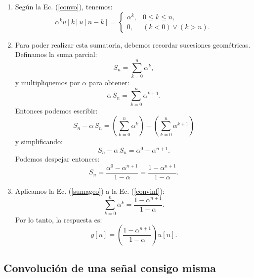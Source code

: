 \documentclass[11pt,a4paper,openany]{book}
\begin{document}
\begin{enumerate}
	\item Según la Ec. (\ref{convo}), tenemos:
	\begin{equation}
		\alpha^{k} u[k] u[n-k] = \begin{cases}
			\alpha^k, & 0 \leq k \leq n, \\ 
			0, & (k < 0) \lor (k > n).
		\end{cases}
		\label{convinf}
	\end{equation}
	
	\item Para poder realizar esta sumatoria, debemos recordar sucesiones geométricas. Definamos la suma parcial:
	\begin{equation}
		S_{n} = \sum_{k=0}^n \alpha^k,
	\end{equation}
	y multipliquemos por $\alpha$ para obtener:
	\begin{equation}
		\alpha \, S_{n} = \sum_{k=0}^n \alpha^{k+1}.
	\end{equation}
	Entonces podemos escribir:
	\begin{equation}
		S_{n} - \alpha \, S_{n} = \left( \sum_{k=0}^n \alpha^k \right) - \left( \sum_{k=0}^n \alpha^{k+1} \right)
	\end{equation}
	y simplificando:
	\begin{equation}
		S_n - \alpha \, S_n = \alpha^0 - \alpha^{n+1}.
	\end{equation}
	Podemos despejar entonces:
	\begin{equation}
		S_n = \frac{\alpha^0 - \alpha^{n+1}}{1-\alpha} = \frac{1-\alpha^{n+1}}{1-\alpha}.
		\label{sumageo}
	\end{equation}
	
	\item Aplicamos la Ec. (\ref{sumageo}) a la Ec. (\ref{convinf}):
	\begin{equation}
		\sum_{k=0}^n \alpha^k = \frac{1-\alpha^{n+1}}{1-\alpha}.
		\label{sumaserie}
	\end{equation}
	Por lo tanto, la respuesta es:
	\begin{equation}
		y[n] = \left( \frac{1-\alpha^{n+1}}{1-\alpha} \right) u[n].
	\end{equation}
\end{enumerate}

\subsection{Convolución de una señal consigo misma}
\end{document}
